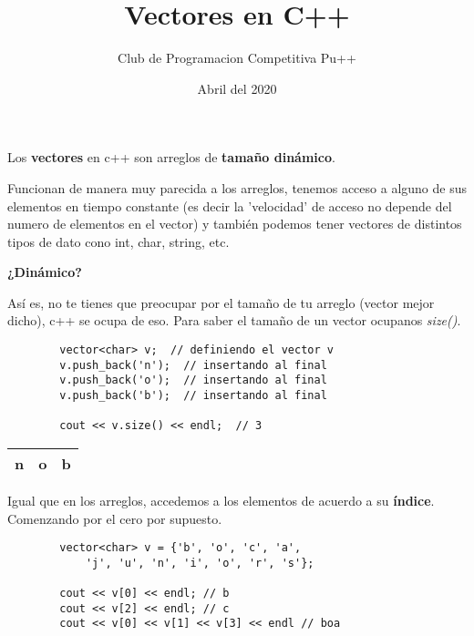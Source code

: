 \documentclass[10pt]{beamer}
\title{Vectores en C++}
\author{Club de Programacion Competitiva Pu++}
\date{Abril del 2020}
\begin{document}
\maketitle

\begin{frame}{}
  Los \textbf{vectores} en c++ son arreglos de \textbf{tamaño dinámico}.
  
  Funcionan de manera muy parecida a los arreglos, tenemos acceso a alguno de sus elementos en tiempo constante (es decir la 'velocidad' de acceso no depende del numero de elementos en el vector) y también podemos tener vectores de distintos tipos de dato cono int, char, string, etc.

  \framebreak

  \textbf{¿Dinámico?}
  
  Así es, no te tienes que preocupar por el tamaño de tu arreglo (vector mejor dicho), c++ se ocupa de eso.
  Para saber el tamaño de un vector ocupanos \textit{size()}.
  
    \begin{verbatim}
        vector<char> v;  // definiendo el vector v
        v.push_back('n');  // insertando al final
        v.push_back('o');  // insertando al final
        v.push_back('b');  // insertando al final
        
        cout << v.size() << endl;  // 3
  \end{verbatim}

  \begin{center}
    \begin{tabular}{ |c|c|c| } 
      \hline
      n & o & b  \\
      \hline
    \end{tabular}
  \end{center}


  \framebreak

    Igual que en los arreglos, accedemos a los elementos de acuerdo a su \textbf{índice}. Comenzando por el cero por supuesto.
    
    \begin{verbatim}
        vector<char> v = {'b', 'o', 'c', 'a',
            'j', 'u', 'n', 'i', 'o', 'r', 's'};
        
        cout << v[0] << endl; // b
        cout << v[2] << endl; // c
        cout << v[0] << v[1] << v[3] << endl // boa

  \end{verbatim}

  \framebreak


\end{frame}
\end{document}
